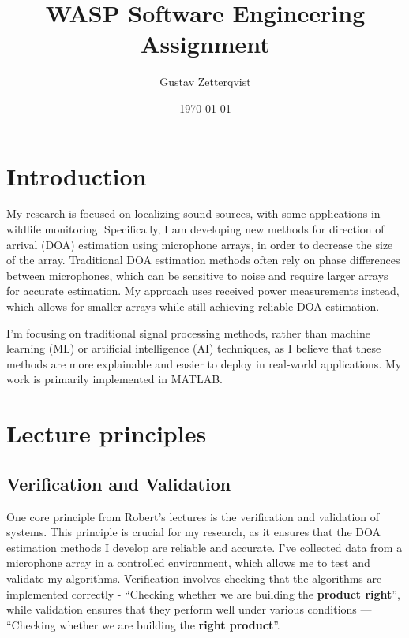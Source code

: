 \documentclass[a4paper,11pt]{article}
\title{WASP Software Engineering Assignment}
\author{Gustav Zetterqvist}
\date{\today}
\begin{document}
\maketitle

\section{Introduction}
My research is focused on localizing sound sources, with some applications in wildlife monitoring. Specifically, I am developing new methods for direction of arrival (DOA) estimation using microphone arrays, in order to decrease the size of the array. Traditional DOA estimation methods often rely on phase differences between microphones, which can be sensitive to noise and require larger arrays for accurate estimation. My approach uses received power measurements instead, which allows for smaller arrays while still achieving reliable DOA estimation.

I'm focusing on traditional signal processing methods, rather than machine learning (ML) or artificial intelligence (AI) techniques, as I believe that these methods are more explainable and easier to deploy in real-world applications. My work is primarily implemented in \textsc{MATLAB}. 

\section{Lecture principles}
\subsection{Verification and Validation}
One core principle from Robert's lectures is the verification and validation of systems. This principle is crucial for my research, as it ensures that the DOA estimation methods I develop are reliable and accurate. 
I've collected data from a microphone array in a controlled environment, which allows me to test and validate my algorithms. Verification involves checking that the algorithms are implemented correctly - ``Checking whether we are building the \textbf{product right}'', while validation ensures that they perform well under various conditions --- ``Checking whether we are building the \textbf{right product}''.
\end{document}
